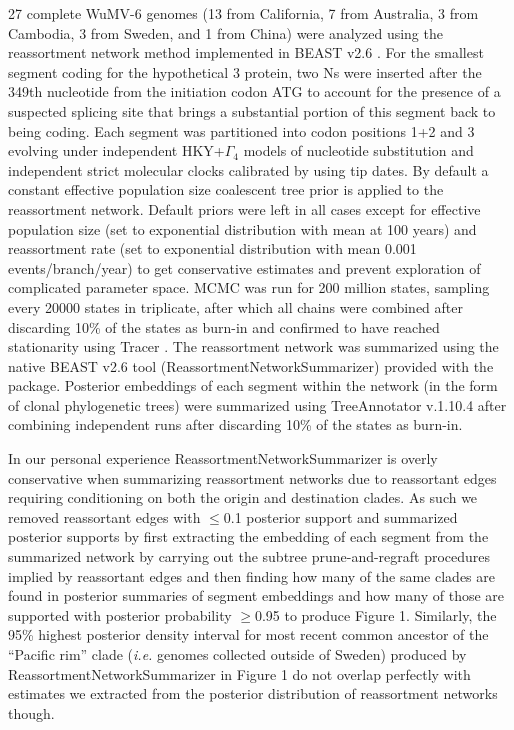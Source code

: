 \documentclass[11pt]{article}
\begin{document}
27 complete WuMV-6 genomes (13 from California, 7 from Australia, 3 from Cambodia, 3 from Sweden, and 1 from China) were analyzed using the reassortment network method \citep{muller_bayesian_2020} implemented in BEAST v2.6 \citep{bouckaert_beast_2019}.
For the smallest segment coding for the hypothetical 3 protein, two Ns were inserted after the 349th nucleotide from the initiation codon ATG to account for the presence of a suspected splicing site \citep{batson_single_2021} that brings a substantial portion of this segment back to being coding.
Each segment was partitioned into codon positions 1+2 and 3 evolving under independent HKY+$\Gamma_{4}$ \citep{hasegawa_dating_1985} models of nucleotide substitution and independent strict molecular clocks calibrated by using tip dates.
By default a constant effective population size coalescent tree prior is applied to the reassortment network.
Default priors were left in all cases except for effective population size (set to exponential distribution with mean at 100 years) and reassortment rate (set to exponential distribution with mean 0.001 events/branch/year) to get conservative estimates and prevent exploration of complicated parameter space.
MCMC was run for 200 million states, sampling every 20000 states in triplicate, after which all chains were combined after discarding 10\% of the states as burn-in and confirmed to have reached stationarity using Tracer \citep{rambaut_posterior_2018}.
The reassortment network was summarized using the native BEAST v2.6 tool (ReassortmentNetworkSummarizer) provided with the package.
Posterior embeddings of each segment within the network (in the form of clonal phylogenetic trees) were summarized using TreeAnnotator v.1.10.4 after combining independent runs after discarding 10\% of the states as burn-in.

In our personal experience ReassortmentNetworkSummarizer is overly conservative when summarizing reassortment networks due to reassortant edges requiring conditioning on both the origin and destination clades.
As such we removed reassortant edges with $\leq$0.1 posterior support and summarized posterior supports by first extracting the embedding of each segment from the summarized network by carrying out the subtree prune-and-regraft procedures implied by reassortant edges and then finding how many of the same clades are found in posterior summaries of segment embeddings and how many of those are supported with posterior probability $\geq$0.95 to produce Figure 1.
Similarly, the 95\% highest posterior density interval for most recent common ancestor of the ``Pacific rim'' clade (\textit{i.e.} genomes collected outside of Sweden) produced by ReassortmentNetworkSummarizer in Figure 1 do not overlap perfectly with estimates we extracted from the posterior distribution of reassortment networks though.
\end{document}
